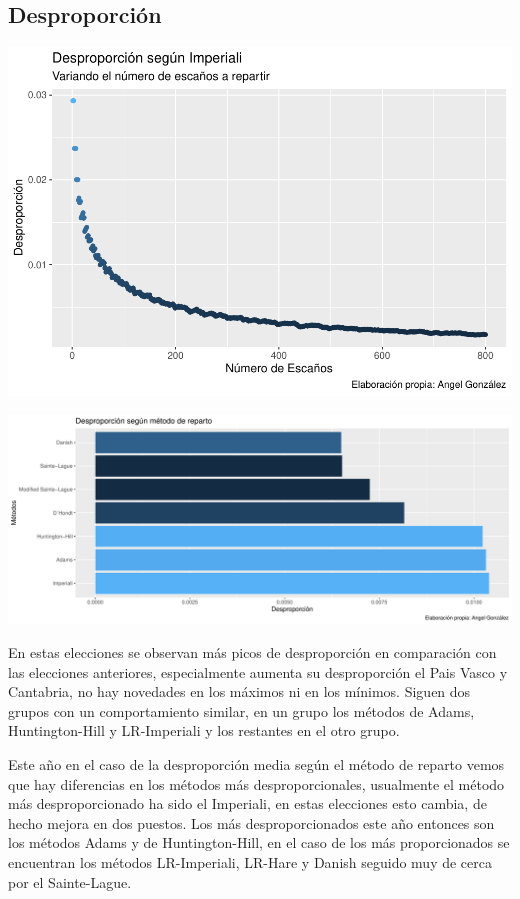 \documentclass[12pt,a4paper,]{book}
\numberwithin{dummy}{section}
\theoremstyle{ocrenumbox}
\theoremstyle{blacknumex}
\theoremstyle{blacknumbox}
\theoremstyle{ocrenum}
\theoremstyle{ocrenum}
\begin{document}
\hypertarget{desproporciuxf3n-5}{%
\subsection{Desproporción}\label{desproporciuxf3n-5}}

\begin{center}\includegraphics[width=1\linewidth]{figurasR/unnamed-chunk-21-1} \end{center}

\begin{center}\includegraphics[width=1\linewidth]{figurasR/unnamed-chunk-21-2} \end{center}

En estas elecciones se observan más picos de desproporción en
comparación con las elecciones anteriores, especialmente aumenta su
desproporción el Pais Vasco y Cantabria, no hay novedades en los máximos
ni en los mínimos. Siguen dos grupos con un comportamiento similar, en
un grupo los métodos de Adams, Huntington-Hill y LR-Imperiali y los
restantes en el otro grupo.

Este año en el caso de la desproporción media según el método de reparto
vemos que hay diferencias en los métodos más desproporcionales,
usualmente el método más desproporcionado ha sido el Imperiali, en estas
elecciones esto cambia, de hecho mejora en dos puestos. Los más
desproporcionados este año entonces son los métodos Adams y de
Huntington-Hill, en el caso de los más proporcionados se encuentran los
métodos LR-Imperiali, LR-Hare y Danish seguido muy de cerca por el
Sainte-Lague.
\end{document}
